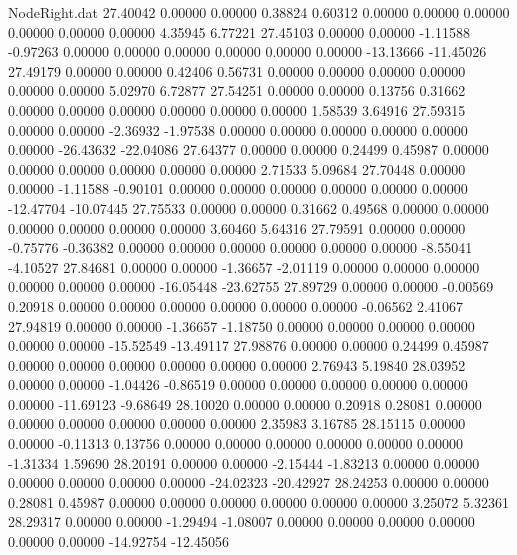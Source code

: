 \begin{filecontents}{NodeRight.dat}
  27.40042    0.00000    0.00000     0.38824    0.60312    0.00000    0.00000    0.00000    0.00000    0.00000    0.00000    4.35945    6.77221
  27.45103    0.00000    0.00000    -1.11588   -0.97263    0.00000    0.00000    0.00000    0.00000    0.00000    0.00000  -13.13666  -11.45026
  27.49179    0.00000    0.00000     0.42406    0.56731    0.00000    0.00000    0.00000    0.00000    0.00000    0.00000    5.02970    6.72877
  27.54251    0.00000    0.00000     0.13756    0.31662    0.00000    0.00000    0.00000    0.00000    0.00000    0.00000    1.58539    3.64916
  27.59315    0.00000    0.00000    -2.36932   -1.97538    0.00000    0.00000    0.00000    0.00000    0.00000    0.00000  -26.43632  -22.04086
  27.64377    0.00000    0.00000     0.24499    0.45987    0.00000    0.00000    0.00000    0.00000    0.00000    0.00000    2.71533    5.09684
  27.70448    0.00000    0.00000    -1.11588   -0.90101    0.00000    0.00000    0.00000    0.00000    0.00000    0.00000  -12.47704  -10.07445
  27.75533    0.00000    0.00000     0.31662    0.49568    0.00000    0.00000    0.00000    0.00000    0.00000    0.00000    3.60460    5.64316
  27.79591    0.00000    0.00000    -0.75776   -0.36382    0.00000    0.00000    0.00000    0.00000    0.00000    0.00000   -8.55041   -4.10527
  27.84681    0.00000    0.00000    -1.36657   -2.01119    0.00000    0.00000    0.00000    0.00000    0.00000    0.00000  -16.05448  -23.62755
  27.89729    0.00000    0.00000    -0.00569    0.20918    0.00000    0.00000    0.00000    0.00000    0.00000    0.00000   -0.06562    2.41067
  27.94819    0.00000    0.00000    -1.36657   -1.18750    0.00000    0.00000    0.00000    0.00000    0.00000    0.00000  -15.52549  -13.49117
  27.98876    0.00000    0.00000     0.24499    0.45987    0.00000    0.00000    0.00000    0.00000    0.00000    0.00000    2.76943    5.19840
  28.03952    0.00000    0.00000    -1.04426   -0.86519    0.00000    0.00000    0.00000    0.00000    0.00000    0.00000  -11.69123   -9.68649
  28.10020    0.00000    0.00000     0.20918    0.28081    0.00000    0.00000    0.00000    0.00000    0.00000    0.00000    2.35983    3.16785
  28.15115    0.00000    0.00000    -0.11313    0.13756    0.00000    0.00000    0.00000    0.00000    0.00000    0.00000   -1.31334    1.59690
  28.20191    0.00000    0.00000    -2.15444   -1.83213    0.00000    0.00000    0.00000    0.00000    0.00000    0.00000  -24.02323  -20.42927
  28.24253    0.00000    0.00000     0.28081    0.45987    0.00000    0.00000    0.00000    0.00000    0.00000    0.00000    3.25072    5.32361
  28.29317    0.00000    0.00000    -1.29494   -1.08007    0.00000    0.00000    0.00000    0.00000    0.00000    0.00000  -14.92754  -12.45056

\end{filecontents}
